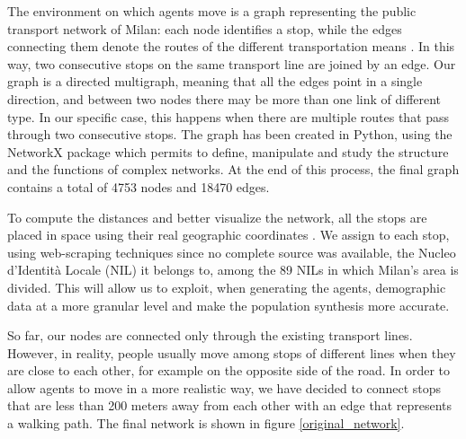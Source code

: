 The environment on which agents move is a graph representing the public transport network of Milan: each node identifies a stop, while the edges connecting them denote the routes of the different transportation means \cite{site3, site7}. In this way, two consecutive stops on the same transport line are joined by an edge. Our graph is a directed multigraph, meaning that all the edges point in a single direction, and between two nodes there may be more than one link of different type. In our specific case, this happens when there are multiple routes that pass through two consecutive stops. The graph has been created in Python, using the NetworkX package which permits to define, manipulate and study the structure and the functions of complex networks. At the end of this process, the final graph contains a total of 4753 nodes and 18470 edges. 

To compute the distances and better visualize the network, all the stops are placed in space using their real geographic coordinates \cite{site2,site6}. We assign to each stop, using web-scraping techniques since no complete source was available, the Nucleo d'Identità Locale (NIL) it belongs to, among the 89 NILs in which Milan's area is divided. This will allow us to exploit, when generating the agents, demographic data at a more granular level and make the population synthesis more accurate. 

So far, our nodes are connected only through the existing transport lines. However, in reality, people usually move among stops of different lines when they are close to each other, for example on the opposite side of the road. In order to allow agents to move in a more realistic way, we have decided to connect stops that are less than 200 meters away from each other with an edge that represents a walking path. The final network is shown in figure \ref{original_network}.


